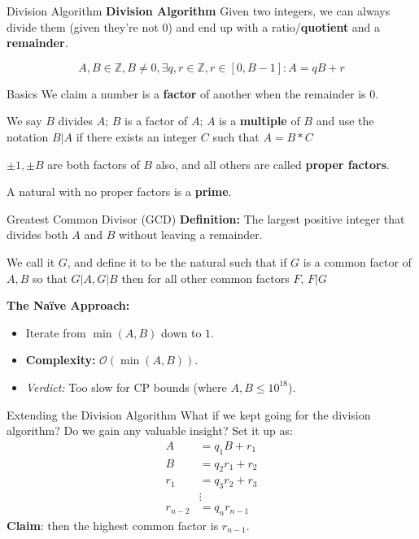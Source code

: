 \documentclass[aspectratio=169]{beamer}
\begin{document}
\begin{frame}{Division Algorithm}
    \textbf{Division Algorithm} Given two integers, we can always divide them (given they're not 0) and end up with a ratio/\textbf{quotient} and a \textbf{remainder}.
    
    $$A, B \in \mathbb{Z}, B \neq 0, \exists q,r \in \mathbb{Z}, r \in [0, B-1]: A = qB+r$$
\end{frame}

\begin{frame}{Basics}
    We claim a number is a \textbf{factor} of another when the remainder is $0$.
    
    We say $B$ divides $A$; $B$ is a factor of $A$; $A$ is a \textbf{multiple} of $B$ and use the notation $B|A$ if there exists an integer $C$ such that $A = B * C$

    $\pm1, \pm B$ are both factors of $B$ also, and all others are called \textbf{proper factors}.

    A natural with no proper factors is a \textbf{prime}.
\end{frame}

\begin{frame}{Greatest Common Divisor (GCD)}
    \textbf{Definition:} The largest positive integer that divides both $A$ and $B$ without leaving a remainder.

    We call it $G$, and define it to be the natural such that if $G$ is a common factor of $A, B$ so that $G|A, G|B$ then for all other common factors $F$, $F|G$
    
    \vspace{0.5cm}
    \textbf{The Naïve Approach:}
    \begin{itemize}
        \item Iterate from $\min(A, B)$ down to $1$.
        \item \textbf{Complexity:} $\mathcal{O}(\min(A, B))$.
        \item \textit{Verdict:} Too slow for CP bounds (where $A, B \le 10^{18}$).
    \end{itemize}
\end{frame}

\begin{frame}{Extending the Division Algorithm}
    What if we kept going for the division algorithm? Do we gain any valuable insight?
    \pause 
    Set it up as:
    \begin{align*}
    A &= q_1B+ r_1\\
    B &= q_2r_1 + r_2\\
    r_1 &= q_3r_2 + r_3\\
    &\vdots\\
    r_{n-2} &= q_nr_{n-1}
  \end{align*}
  \pause
  \textbf{Claim}: then the highest common factor is $r_{n-1}$.
\end{frame}
\end{document}
